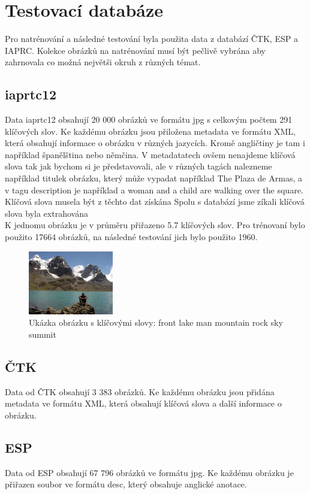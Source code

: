 \documentclass[czech,BP]{thesiskiv}
\begin{document}
\chapter{Testovací databáze}
Pro natrénování a následné testování byla použita data z databází ČTK, ESP a IAPRC. Kolekce obrázků na natrénování musí být pečlivě vybrána aby zahrnovala co možná největši okruh z různých témat.

\section{iaprtc12}
Data iaprtc12 obsahují 20 000 obrázků ve formátu jpg s celkovým počtem 291 klíčových slov. Ke každému obrázku jsou přiložena metadata ve formátu XML, která obsahují informace o obrázku v různých jazycích. Kromě angličtiny je tam i například španělština nebo němčina. V metadatatech ovšem nenajdeme klíčová slova tak jak bychom si je představovali, ale v různých tagách nalezneme například titulek obrázku, který může vypadat například The Plaza de Armas, a v tagu description je například  a woman and a child are walking over the square. Klíčová slova musela být z těchto dat získána Spolu s  databází jsme zíkali klíčová slova byla extrahována\\
K jednomu obrázku je v průměru přiřazeno 5.7 klíčových slov. Pro trénovaní bylo použito 17664 obrázků, na následné testování jich bylo použito 1960. 


\begin{figure}[h]
		\centering
		\includegraphics[width=140px]{./img/iaprtc12.jpg}	
		\caption{Ukázka obrázku s klíčovými slovy: front lake man mountain rock sky summit}
\end{figure}

\section{ČTK}
Data od ČTK obsahují 3 383 obrázků. Ke každému obrázku jsou přidána metadata ve formátu XML, která obsahují klíčová slova a další informace o obrázku. 

\section{ESP}
Data od ESP obsahují 67 796 obrázků ve formátu jpg. Ke každému obrázku je přiřazen soubor ve formátu desc, který obsahuje anglické anotace.
\end{document}

